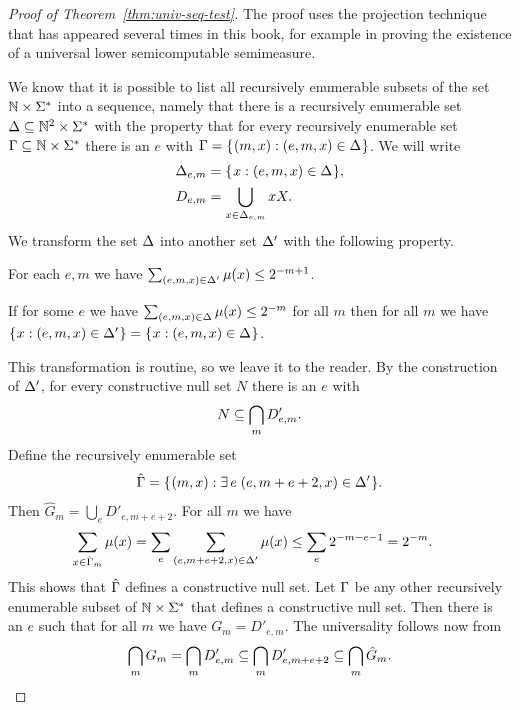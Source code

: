\begin{proof}[Proof of Theorem~\protect\ref{thm:univ-seq-test}]
  \leanok
The proof uses the projection technique that has appeared several times in this
book, for example in proving the existence of a universal lower semicomputable
semimeasure.

We know that it is possible to list all recursively enumerable subsets of the
set \( \mathbb{N}\times\Sigma^{*} \) into a sequence, namely that there is a recursively
enumerable set \( \Delta\subseteq\mathbb{N}^{2}\times\Sigma^{*} \)
with the property that for every recursively enumerable
set \( \Gamma\subseteq\mathbb{N}\times\Sigma^{*} \) there is an \( e \) with
\( \Gamma=\mathopen\{\mskip 1mu(m,x): (e,m,x)\in\Delta\mskip 1mu\mathclose\} \).
We will write
 \begin{align*}
  \Delta_{e,m}&=\mathopen\{\mskip 1mu x:(e,m,x)\in\Delta\mskip 1mu\mathclose\},
\\ D_{e,m}&=\bigcup_{x\in\Delta_{e,m}}xX.
\end{align*}
 We transform the set \( \Delta \) into another set \( \Delta' \)
with the following property.
\begin{bullets}
\item For each \( e,m \) we have \( \sum_{(e,m,x)\in\Delta'}\mu(x) \le 2^{-m+1} \).
\item If  for some \( e \) we have
\( \sum_{(e,m,x)\in\Delta}\mu(x)\le 2^{-m} \) for all \( m \) then for all \( m \) we have
\( \mathopen\{\mskip 1mu x: (e,m,x)\in\Delta'\mskip 1mu\mathclose\}=\mathopen\{\mskip 1mu x: (e,m,x)\in\Delta\mskip 1mu\mathclose\} \).
\end{bullets}
This transformation is routine, so we leave it to the reader.
By the construction of \( \Delta' \), for every constructive null set \( N \) there is an \( e \)
with
 \begin{align*}
   N\subseteq\bigcap_{m}D'_{e,m}.
 \end{align*}
Define the recursively enumerable set
 \begin{align*}
   \hat{\Gamma}=\mathopen\{\mskip 1mu(m,x): \exists\, e\; (e,m+e+2,x)\in\Delta'\mskip 1mu\mathclose\}.
 \end{align*}
Then \( \hat G_{m}=\bigcup_{e}D'_{e,m+e+2} \).
For all \( m \) we have
 \begin{align*}
\sum_{x\in\hat{\Gamma}_{m}}\mu(x)&=\sum_{e}\sum_{(e,m+e+2,x)\in\Delta'}\mu(x)
 \le \sum_{e}2^{-m-e-1} = 2^{-m}.
 \end{align*}
This shows that \( \hat{\Gamma} \) defines a constructive null set.
Let \( \Gamma \) be any other recursively enumerable subset of \( \mathbb{N}\times\Sigma^{*} \) that
defines a constructive null set.
Then there is an \( e \) such that for all \( m \) we have \( G_{m}=D'_{e,m} \).
The universality follows now from
 \begin{align*}
\bigcap_{m}G_{m}=\bigcap_{m}D'_{e,m}\subseteq \bigcap_{m}D'_{e,m+e+2} \subseteq\bigcap_{m}\hat G_{m}.
 \end{align*}
\end{proof}


